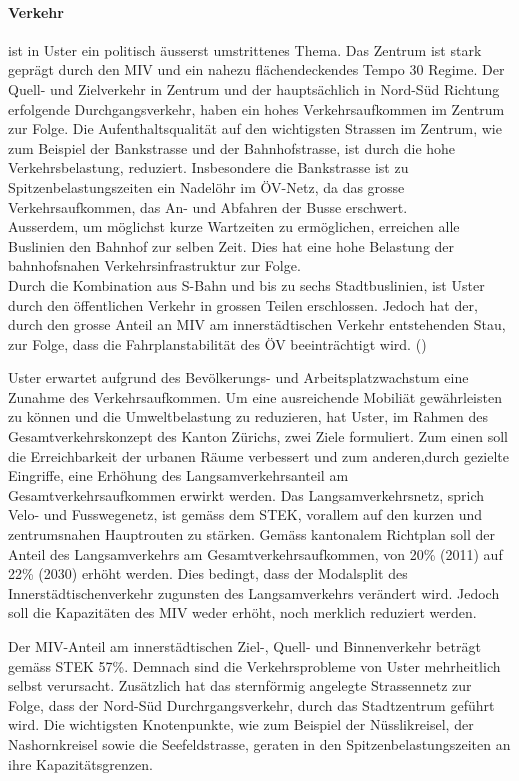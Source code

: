 \paragraph{Verkehr} ist in Uster ein politisch äusserst umstrittenes Thema. Das Zentrum ist stark geprägt durch den MIV und ein nahezu flächendeckendes Tempo 30 Regime. Der Quell- und Zielverkehr in Zentrum und der hauptsächlich in Nord-Süd Richtung erfolgende Durchgangsverkehr, haben ein hohes Verkehrsaufkommen im Zentrum zur Folge. Die Aufenthaltsqualität auf den wichtigsten Strassen im Zentrum, wie zum Beispiel der Bankstrasse und der Bahnhofstrasse, ist durch die hohe Verkehrsbelastung, reduziert. Insbesondere die Bankstrasse ist zu Spitzenbelastungszeiten ein Nadelöhr im ÖV-Netz, da das grosse Verkehrsaufkommen, das An- und Abfahren der Busse erschwert. \\
Ausserdem, um möglichst kurze Wartzeiten zu ermöglichen, erreichen alle Buslinien den Bahnhof zur selben Zeit. Dies hat eine hohe Belastung der bahnhofsnahen Verkehrsinfrastruktur zur Folge. \\
Durch die Kombination aus S-Bahn und bis zu sechs Stadtbuslinien, ist Uster durch den öffentlichen Verkehr in grossen Teilen erschlossen. Jedoch hat der, durch den grosse Anteil an MIV am innerstädtischen Verkehr entstehenden Stau, zur Folge, dass die Fahrplanstabilität des ÖV beeinträchtigt wird. (\cite{STEK})

Uster erwartet aufgrund des Bevölkerungs- und Arbeitsplatzwachstum eine Zunahme des Verkehrsaufkommen. Um eine ausreichende Mobiliät gewährleisten zu können und die Umweltbelastung zu reduzieren, hat Uster, im Rahmen des Gesamtverkehrskonzept des Kanton Zürichs, zwei Ziele formuliert. Zum einen soll die Erreichbarkeit der urbanen Räume verbessert und zum anderen,durch gezielte Eingriffe, eine Erhöhung des Langsamverkehrsanteil am Gesamtverkehrsaufkommen erwirkt werden. Das Langsamverkehrsnetz, sprich Velo- und Fusswegenetz, ist gemäss dem STEK, vorallem auf den kurzen und zentrumsnahen Hauptrouten zu stärken. Gemäss kantonalem Richtplan soll der Anteil des Langsamverkehrs am Gesamtverkehrsaufkommen, von 20\% (2011) auf 22\% (2030) erhöht werden. Dies bedingt, dass der Modalsplit des Innerstädtischenverkehr zugunsten des Langsamverkehrs verändert wird. Jedoch soll die Kapazitäten des MIV weder erhöht, noch merklich reduziert werden. 

Der MIV-Anteil am innerstädtischen Ziel-, Quell- und Binnenverkehr beträgt gemäss STEK 57\%. Demnach sind die Verkehrsprobleme von Uster mehrheitlich selbst verursacht. Zusätzlich hat das sternförmig angelegte Strassennetz zur Folge, dass der Nord-Süd Durchrgangsverkehr, durch das Stadtzentrum geführt wird. Die wichtigsten Knotenpunkte, wie zum Beispiel der Nüsslikreisel, der Nashornkreisel sowie die Seefeldstrasse, geraten in den Spitzenbelastungszeiten an ihre Kapazitätsgrenzen.

